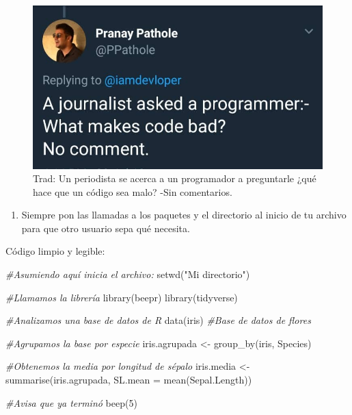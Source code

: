 \documentclass[
]{book}
\newenvironment{Shaded}{\begin{snugshade}}{\end{snugshade}}
\newcommand{\AttributeTok}[1]{\textcolor[rgb]{0.77,0.63,0.00}{#1}}
\newcommand{\CommentTok}[1]{\textcolor[rgb]{0.56,0.35,0.01}{\textit{#1}}}
\newcommand{\DecValTok}[1]{\textcolor[rgb]{0.00,0.00,0.81}{#1}}
\newcommand{\FunctionTok}[1]{\textcolor[rgb]{0.00,0.00,0.00}{#1}}
\newcommand{\NormalTok}[1]{#1}
\newcommand{\OtherTok}[1]{\textcolor[rgb]{0.56,0.35,0.01}{#1}}
\newcommand{\StringTok}[1]{\textcolor[rgb]{0.31,0.60,0.02}{#1}}
\providecommand{\tightlist}{%
  \setlength{\itemsep}{0pt}\setlength{\parskip}{0pt}}
\begin{document}
\begin{figure}

{\centering \includegraphics[width=10in]{images/tweet1} 

}

\caption{Trad: Un periodista se acerca a un programador a preguntarle ¿qué hace que un código sea malo? -Sin comentarios.}\label{fig:unnamed-chunk-297}
\end{figure}

\begin{enumerate}
\def\labelenumi{\arabic{enumi}.}
\setcounter{enumi}{6}
\tightlist
\item
  Siempre pon las llamadas a los paquetes y el directorio al inicio de tu archivo para que otro usuario sepa qué necesita.
\end{enumerate}

Código limpio y legible:

\begin{Shaded}
\begin{Highlighting}[]
\CommentTok{\#Asumiendo aquí inicia el archivo:}
\FunctionTok{setwd}\NormalTok{(}\StringTok{"Mi directorio"}\NormalTok{)}

\CommentTok{\#Llamamos la librería}
\FunctionTok{library}\NormalTok{(beepr)}
\FunctionTok{library}\NormalTok{(tidyverse)}

\CommentTok{\#Analizamos una base de datos de R}
\FunctionTok{data}\NormalTok{(iris) }\CommentTok{\#Base de datos de flores}

\CommentTok{\#Agrupamos la base por especie}
\NormalTok{iris.agrupada }\OtherTok{\textless{}{-}} \FunctionTok{group\_by}\NormalTok{(iris, Species)}

\CommentTok{\#Obtenemos la media por longitud de sépalo}
\NormalTok{iris.media    }\OtherTok{\textless{}{-}} \FunctionTok{summarise}\NormalTok{(iris.agrupada, }\AttributeTok{SL.mean =} \FunctionTok{mean}\NormalTok{(Sepal.Length))}

\CommentTok{\#Avisa que ya terminó}
\FunctionTok{beep}\NormalTok{(}\DecValTok{5}\NormalTok{)}
\end{Highlighting}
\end{Shaded}
\end{document}
